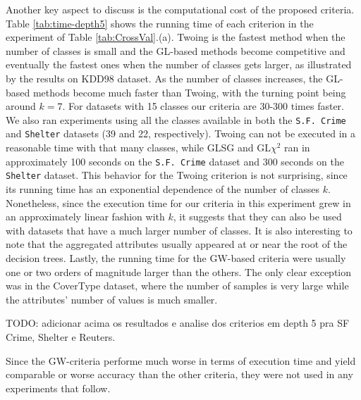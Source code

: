 Another key aspect to discuss is the computational cost of the
proposed criteria. Table \ref{tab:time-depth5} shows the running time of each criterion in the experiment of Table \ref{tab:CrossVal}.(a). Twoing is the fastest method when the number of classes is small and the GL-based methods become competitive and eventually the
fastest ones when the number of classes gets larger, as illustrated by the results on KDD98 dataset. As the number of classes increases, the GL-based methods become much faster than Twoing, with the turning point being around $k=7$. For datasets with 15 classes our criteria are 30-300 times faster. We also ran experiments using all the classes available in both the {\tt S.F. Crime} and {\tt Shelter} datasets (39 and 22, respectively). Twoing can not be executed in a reasonable time with that many classes, while GLSG and GL$\chi^2$ ran in approximately 100 seconds on the {\tt S.F. Crime} dataset and  300 seconds on the {\tt Shelter} dataset.  This behavior for the Twoing criterion is not surprising, since its running time has an exponential dependence of the number of classes $k$. Nonetheless, since the execution time for our criteria in this experiment grew in an approximately linear fashion with $k$, it suggests that they can also be used with datasets that have a much larger number of classes. It is also interesting to note that the aggregated attributes usually appeared at or near the root of the decision trees. Lastly, the running time for the GW-based criteria were usually one or two orders of magnitude larger than the others. The only clear exception was in the CoverType dataset, where the number of samples is very large while the attributes’ number of values is much smaller.

TODO: adicionar acima os resultados e analise dos criterios em depth 5 pra SF Crime, Shelter e Reuters.

Since the GW-criteria performe much worse in terms of execution time and yield comparable or worse accuracy than the other criteria, they were not used in any experiments that follow.

